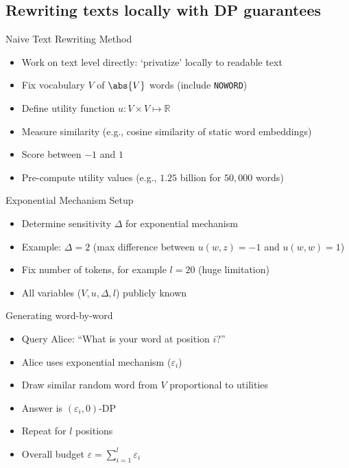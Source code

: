 \documentclass[12pt,aspectratio=169,handout]{beamer}
\begin{document}
\subsection{Rewriting texts locally with DP guarantees}

\begin{frame}{Naive Text Rewriting Method}
\begin{itemize}
\item Work on text level directly: `privatize' locally to readable text
\item Fix vocabulary $V$ of $\abs{V}$ words (include \texttt{NOWORD})
\item Define utility function $u: V \times V \mapsto \mathbb{R}$
\item Measure similarity (e.g., cosine similarity of static word embeddings)
\item Score between $-1$ and $1$
\item Pre-compute utility values (e.g., $1.25$ billion for $50,000$ words)
\end{itemize}
\end{frame}

\begin{frame}{Exponential Mechanism Setup}
\begin{itemize}
\item Determine sensitivity $\Delta$ for exponential mechanism
\item Example: $\Delta = 2$ (max difference between $u(w, z) = -1$ and $u(w, w) = 1$)
\item Fix number of tokens, for example $l = 20$ (huge limitation)
\item All variables ($V, u, \Delta, l$) publicly known
\end{itemize}
\end{frame}

\begin{frame}{Generating word-by-word}
\begin{itemize}
\item Query Alice: ``What is your word at position $i$?''
\item Alice uses exponential mechanism ($\varepsilon_i$)
\item Draw similar random word from $V$ proportional to utilities
\item Answer is $(\varepsilon_i, 0)$-DP
\item Repeat for $l$ positions
\item Overall budget $\varepsilon = \sum_{i = 1}^{l} \varepsilon_i$
\end{itemize}
\end{frame}
\end{document}
